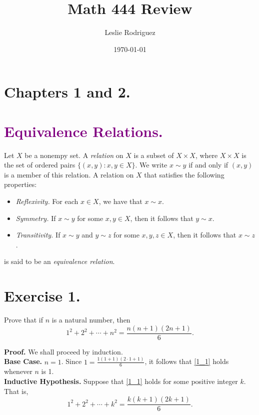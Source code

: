 \documentclass[9pt]{article}
\title{Math 444 Review}
\author{Leslie Rodriguez}
\date{\today}
\newcommand{\D}{\displaystyle}
\begin{document}
   \maketitle

   \section*{Chapters 1 and 2.}

   \section*{\textcolor{purple}{Equivalence Relations.}} Let $X$ be a nonempy 
   set. A \textit{relation} on $X$ is a subset of $X \times X$, where
   $X \times X$ is the set of ordered pairs $\{(x, y) : x, y \in X\}$. We write 
   $x \sim y$ if and only if $(x, y)$ is a member of this relation. A relation
   on $X$ that satisfies the following properties:
   \begin{itemize}
      \item \textit{Reflexivity.} For each $x \in X$, we have that $x \sim x$.
      \item \textit{Symmetry.} If $x \sim y$ for some $x, y \in X$, then it
            follows that $y \sim x$.
      \item \textit{Transitivity.} If $x \sim y$ and $y \sim z$ for some
            $x, y, z \in X$, then it follows that $x \sim z$.
   \end{itemize}
   is said to be an \textit{equivalence relation}.

   \section*{Exercise 1.} Prove that if $n$ is a natural number, then
   \begin{equation}
      1^2 + 2^2 + \cdots + n^2 = \D\frac{n(n+1)(2n+1)}{6}. \label{1_1}
   \end{equation}

   \textbf{Proof.} We shall proceed by induction. \\

   \textbf{Base Case.} $n = 1$. Since $1 = \D\frac{1(1 + 1)(2\cdot1+1)}{6}$, it 
   follows that \eqref{1_1} holds whenever $n$ is 1. \\

   \textbf{Inductive Hypothesis.} Suppose that \eqref{1_1} holds for some
   positive integer $k$. That is,
   \begin{equation}
      1^2 + 2^2 + \cdots + k^2 = \D\frac{k(k+1)(2k+1)}{6}. \label{1_2}
   \end{equation}
\end{document}
